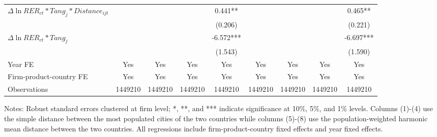 \documentclass[12pt]{article}
\begin{document}
\begin{table}
{\begin{threeparttable}
\begin{tabular}{lcccccccc}
				$\Delta \ln RER_{ct}*Tang_{j}*Distance_{ijt}$ &     &       &       & 0.441** &       &       &       & 0.465** \\
				&    &       &       & (0.206) &       &       &       & (0.221) \\
				$\Delta \ln RER_{ct}*Tang_{j}$ &    &       &       & -6.572*** &       &       &       & -6.697*** \\
				&     &       &       & (1.543) &       &       &       & (1.590) \\
				Year FE  & Yes   & Yes   & Yes   & Yes & Yes   & Yes   & Yes   & Yes\\
				Firm-product-country FE & Yes   & Yes   & Yes   & Yes & Yes   & Yes   & Yes   & Yes\\
				Observations & 1449210 & 1449210 & 1449210 & 1449210 & 1449210 & 1449210 & 1449210 & 1449210\\
				\bottomrule
			\end{tabular}
			\begin{tablenotes}
				\footnotesize
				\item[Notes:]Robust standard errors clustered at firm level; *, **, and *** indicate significance at 10\%, 5\%, and 1\% levels. Columns (1)-(4) use the simple distance between the most populated cities of the two countries while columns (5)-(8) use the population-weighted harmonic mean distance between the two countries. All regressions include firm-product-country fixed effects and year fixed effects.
			\end{tablenotes}
		\end{threeparttable}
	}
	\label{tab.source.distance}
\end{table}
\end{document}

